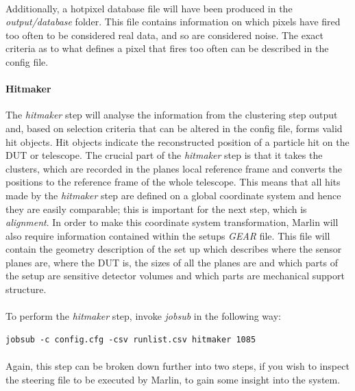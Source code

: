 \documentclass[11pt]{article}
\begin{document}
\paragraph{}
Additionally, a hotpixel database file will have been produced in the \textit{output/database} folder. This file contains information on which pixels have fired too often to be considered real data, and so are considered noise. The exact criteria as to what defines a pixel that fires too often can be described in the config file.
\paragraph{Hitmaker}
The \textit{hitmaker} step will analyse the information from the clustering step output and, based on selection criteria that can be altered in the config file, forms valid hit objects. Hit objects indicate the reconstructed position of a particle hit on the DUT or telescope. The crucial part of the \textit{hitmaker} step is that it takes the clusters, which are recorded in the planes local reference frame and converts the positions to the reference frame of the whole telescope. This means that all hits made by the \textit{hitmaker} step are defined on a global coordinate system and hence they are easily comparable; this is important for the next step, which is \textit{alignment}. In order to make this coordinate system transformation, Marlin will also require information contained within the setups \textit{GEAR} file. This file will contain the geometry description of the set up which describes where the sensor planes are, where the DUT is, the sizes of all the planes are and which parts of the setup are sensitive detector volumes and which parts are mechanical support structure.
\paragraph{}
To perform the \textit{hitmaker} step, invoke \textit{jobsub} in the following way:
\begin{verbatim}
jobsub -c config.cfg -csv runlist.csv hitmaker 1085
\end{verbatim}
\paragraph{}
Again, this step can be broken down further into two steps, if you wish to inspect the steering file to be executed by Marlin, to gain some insight into the system.
\end{document}
